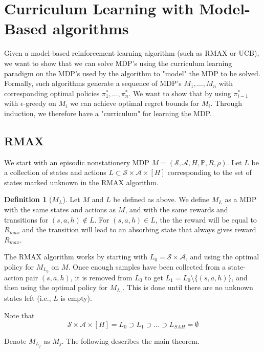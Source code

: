 \documentclass[12pt, letterpaper]{article}
\theoremstyle{definition}
\newtheorem*{defn}{Definition}
\theoremstyle{remark}
\begin{document}
\section{Curriculum Learning with Model-Based algorithms}

Given a model-based reinforcement learning algorithm (such as RMAX or UCB), we want to show that we can solve MDP's using the curriculum learning paradigm on the MDP's used by the algorithm to "model" the MDP to be solved. Formally, such algorithms generate a sequence of MDP's \(M_1, \ldots, M_n\) with corresponding optimal policies \(\pi^*_1, \ldots, \pi^*_n\). We want to show that by using \(\pi^*_{i-1}\) with \(\epsilon\)-greedy on \(M_i\) we can achieve optimal regret bounds for \(M_i\). Through induction, we therefore have a "curriculum" for learning the MDP.

\subsection{RMAX}

We start with an episodic nonstationery MDP \(M = (\mathcal{S}, \mathcal{A}, H, \mathbb{P}, R, \rho)\). Let \(L\) be a collection of states and actions \(L \subset \mathcal{S} \times \mathcal{A} \times [H]\) corresponding to the set of states marked unknown in the RMAX algorithm.

\begin{defn}[\(M_L\)]
    Let \(M\) and \(L\) be defined as above. We define \(M_L\) as a MDP with the same states and actions as \(M\), and with the same rewards and transitions for \((s, a, h) \notin L\). For \((s, a, h) \in L\), the the reward will be equal to \(R_{max}\) and the transition will lead to an absorbing state that always gives reward \(R_{max}\).
\end{defn}

The RMAX algorithm works by starting with \(L_0 = \mathcal{S} \times \mathcal{A}\), and using the optimal policy for \(M_{L_0}\) on \(M\). Once enough samples have been collected from a state-action pair \((s, a, h)\), it is removed from \(L_0\) to get \(L_1 = L_0 \setminus \{(s, a, h)\}\), and then using the optimal policy for \(M_{L_1}\). This is done until there are no unknown states left (i.e., \(L\) is empty).

Note that
\[\mathcal{S} \times \mathcal{A} \times [H] = L_0 \supset L_1 \supset \ldots \supset L_{SAH} = \emptyset\]

Denote \(M_{L_j}\) as \(M_j\). The following describes the main theorem.
\end{document}
